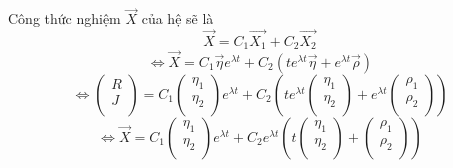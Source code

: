 \documentclass[a4paper]{article}
\begin{document}
    Công thức nghiệm $\vec{X}$ của hệ sẽ là
    \begin{equation*}
        \vec{X} = C_1 \vec{X_1} + C_2 \vec{X_2}
    \end{equation*}
    \begin{equation*}
        \Leftrightarrow
        \vec{X} = C_1 \vec{\eta}e^{\lambda t} + C_2(t e^{\lambda t} \vec{\eta} + e^{\lambda t} \vec{\rho})
    \end{equation*}
    \begin{equation*}
        \Leftrightarrow
        \begin{pmatrix}
            R \\
            J \\
        \end{pmatrix}
        =
        C_1
        \begin{pmatrix}
            \eta_1 \\
            \eta_2 \\
        \end{pmatrix}
        e^{\lambda t}
        +
        C_2(
            t e^{\lambda t}
            \begin{pmatrix}
                \eta_1 \\
                \eta_2 \\
            \end{pmatrix}
            +
            e^{\lambda t}
            \begin{pmatrix}
                \rho_1 \\
                \rho_2 \\
            \end{pmatrix}
        )
    \end{equation*}
    \begin{equation*}
        \Leftrightarrow
        \vec{X} =
        C_1
        \begin{pmatrix}
                \eta_1 \\
                \eta_2 \\
        \end{pmatrix}
        e^{\lambda t}
        +
        C_2 e^{\lambda t}(
            t
            \begin{pmatrix}
                \eta_1 \\
                \eta_2 \\
            \end{pmatrix}
            +
            \begin{pmatrix}
                \rho_1 \\
                \rho_2 \\
            \end{pmatrix}
        )
    \end{equation*}
\end{document}

